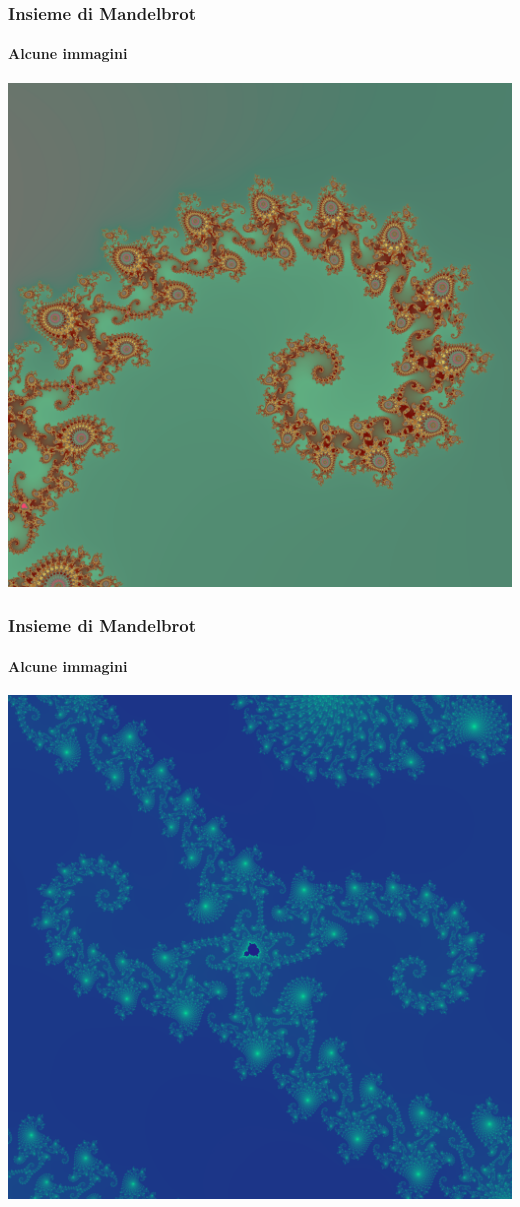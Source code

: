 \documentclass{beamer}
\begin{document}
			\begin{frame}
				\frametitle{Insieme di Mandelbrot}
				\framesubtitle{Alcune immagini}
				\begin{center}
					\includegraphics[width=0.7\linewidth]{"../Insieme di Mandelbrot/detail5"}
				\end{center}
			\end{frame}
			\begin{frame}
				\frametitle{Insieme di Mandelbrot}
				\framesubtitle{Alcune immagini}
				\begin{center}
					\includegraphics[width=0.7\linewidth]{"../Insieme di Mandelbrot/detail6"}
				\end{center}
			\end{frame}
\end{document}
